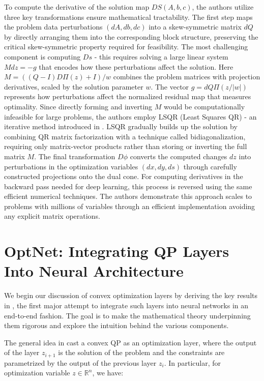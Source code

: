 \documentclass{article}
\begin{document}
To compute the derivative of the solution map $DS(A,b,c)$, the authors utilize three key transformations ensure mathematical tractability. The first step maps the problem data perturbations $(dA,db,dc)$ into a skew-symmetric matrix $dQ$ by directly arranging them into the corresponding block structure, preserving the critical skew-symmetric property required for feasibility. The most challenging component is computing $Ds$ - this requires solving a large linear system $Mdz = -g$ that encodes how these perturbations affect the solution. Here $M = ((Q-I)D\Pi(z)+I)/w$ combines the problem matrices with projection derivatives, scaled by the solution parameter $w$. The vector $g = dQ\Pi(z/|w|)$ represents how perturbations affect the normalized residual map that measures optimality. Since directly forming and inverting $M$ would be computationally infeasible for large problems, the authors employ LSQR (Least Squares QR) - an iterative method introduced in \citep{lsqr}. LSQR gradually builds up the solution by combining QR matrix factorization with a technique called bidiagonalization, requiring only matrix-vector products rather than storing or inverting the full matrix $M$. The final transformation $D\phi$ converts the computed changes $dz$ into perturbations in the optimization variables $(dx,dy,ds)$ through carefully constructed projections onto the dual cone. For computing derivatives in the backward pass needed for deep learning, this process is reversed using the same efficient numerical techniques. The authors demonstrate this approach scales to problems with millions of variables through an efficient implementation avoiding any explicit matrix operations.

\section{OptNet: Integrating QP Layers Into Neural Architecture}
We begin our discussion of convex optimization layers by deriving the key results in \citep{optnet}, the first major attempt to integrate such layers into neural networks in an end-to-end fashion. The goal is to make the mathematical theory underpinning them rigorous and explore the intuition behind the various components. 

The general idea in \citep{optnet} cast a convex QP as an optimization layer, where the output of the layer $z_{i+1}$ is the solution of the problem and the constraints are parametrized by the output of the previous layer $z_i$. In particular, for optimization variable $z \in \mathbb{R}^n$, we have: 
\end{document}
